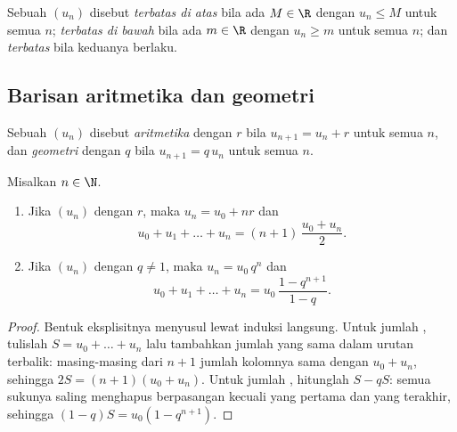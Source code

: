 \begin{definition}\label{def:g12:seq:bounded}
Sebuah  $(u_n)$ disebut \emph{terbatas di atas}
bila ada $M \in \R$ dengan $u_n \leq M$ untuk semua $n$; \emph{terbatas di
bawah} bila ada $m \in \R$ dengan $u_n \geq m$ untuk semua $n$; dan
\emph{terbatas} bila keduanya berlaku.
\end{definition}

\subsection{Barisan aritmetika dan geometri}

\begin{definition}\label{def:g12:seq:arith-geom}
Sebuah  $(u_n)$ disebut \emph{aritmetika}
dengan  $r$ bila $u_{n+1} = u_n + r$ untuk semua $n$, dan
\emph{geometri} dengan  $q$ bila
$u_{n+1} = q\,u_n$ untuk semua $n$.
\end{definition}

\begin{proposition}\label{prop:g12:seq:arith-geom}
Misalkan $n \in \N$.
\begin{enumerate}
  \item Jika $(u_n)$  dengan  $r$, maka
        $u_n = u_0 + nr$ dan
        \[
        u_0 + u_1 + \dots + u_n = (n+1)\,\frac{u_0 + u_n}{2}.
        \]
  \item Jika $(u_n)$  dengan  $q \neq 1$, maka
        $u_n = u_0\, q^n$ dan
        \[
        u_0 + u_1 + \dots + u_n = u_0\,\frac{1 - q^{n+1}}{1 - q}.
        \]
\end{enumerate}
\end{proposition}

\begin{proof}
Bentuk eksplisitnya menyusul lewat induksi langsung. Untuk jumlah
, tulislah $S = u_0 + \dots + u_n$ lalu tambahkan jumlah yang sama
dalam urutan terbalik: masing-masing dari $n+1$ jumlah kolomnya sama dengan
$u_0 + u_n$, sehingga $2S = (n+1)(u_0+u_n)$. Untuk jumlah , hitunglah
$S - qS$: semua sukunya saling menghapus berpasangan kecuali yang pertama dan
yang terakhir, sehingga $(1-q)S = u_0(1 - q^{n+1})$.
\end{proof}


